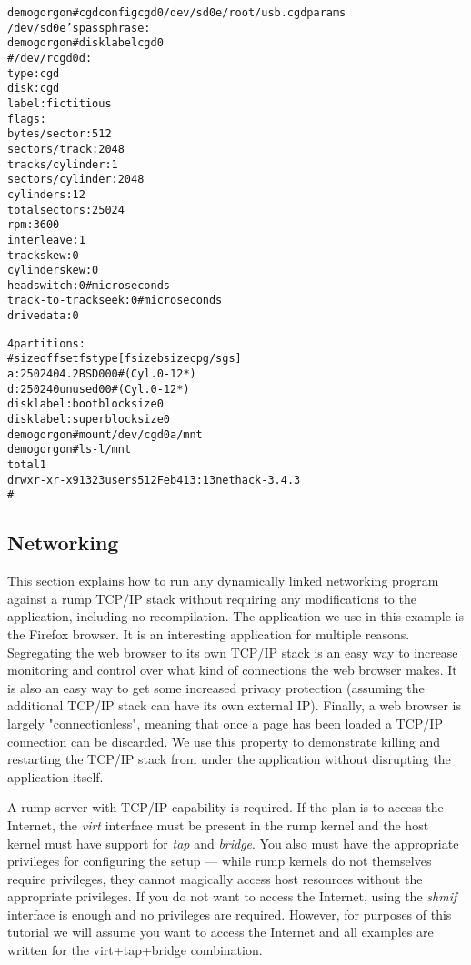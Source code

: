 {\footnotesize
\begin{alltt}
demogorgon# cgdconfig cgd0 /dev/sd0e /root/usb.cgdparams
/dev/sd0e's passphrase:
demogorgon# disklabel cgd0
# /dev/rcgd0d:
type: cgd
disk: cgd
label: fictitious
flags:
bytes/sector: 512
sectors/track: 2048
tracks/cylinder: 1
sectors/cylinder: 2048
cylinders: 12
total sectors: 25024
rpm: 3600
interleave: 1
trackskew: 0
cylinderskew: 0
headswitch: 0           # microseconds
track-to-track seek: 0  # microseconds
drivedata: 0 

4 partitions:
#        size    offset     fstype [fsize bsize cpg/sgs]
 a:     25024         0     4.2BSD      0     0     0  # (Cyl.      0 -     12*)
 d:     25024         0     unused      0     0        # (Cyl.      0 -     12*)
disklabel: boot block size 0
disklabel: super block size 0
demogorgon# mount /dev/cgd0a /mnt
demogorgon# ls -l /mnt
total 1
drwxr-xr-x  9 1323  users  512 Feb  4 13:13 nethack-3.4.3
#
\end{alltt}}

\subsection{Networking}

This section explains how to run any dynamically linked networking
program against a rump TCP/IP stack without requiring any modifications
to the application, including no recompilation.  The application
we use in this example is the Firefox browser.  It is an interesting
application for multiple reasons.  Segregating the web browser to
its own TCP/IP stack is an easy way to increase monitoring and
control over what kind of connections the web browser makes.
It is also an easy way to get some increased privacy protection
(assuming the additional TCP/IP stack can have its own external
IP).  Finally, a web browser is largely "connectionless", meaning
that once a page has been loaded a TCP/IP connection can be discarded.
We use this property to demonstrate killing and restarting the
TCP/IP stack from under the application without disrupting the
application itself.

A rump server with TCP/IP capability is required.  If the plan is to
access the Internet, the \textit{virt}
interface must be present in the rump kernel and the host kernel
must have support for \textit{tap}
and \textit{bridge}.
You also must have the appropriate privileges for configuring the setup
--- while rump kernels do not themselves require privileges, they cannot
magically access host resources without the appropriate privileges.
If you do not want to access the Internet, using the 
\textit{shmif} interface is enough and no privileges are required.
However, for purposes of this tutorial we will assume you want to
access the Internet and all examples are written for the
virt+tap+bridge combination.


